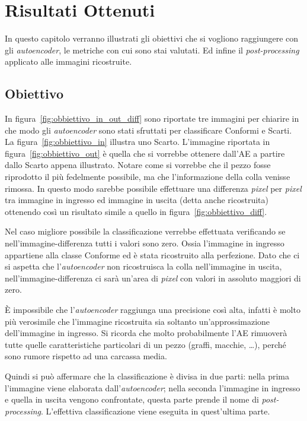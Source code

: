 
\chapter{Risultati Ottenuti}
In questo capitolo verranno illustrati gli obiettivi che si vogliono raggiungere con gli \textit{autoencoder}, le metriche con cui sono stai valutati.
Ed infine il \textit{post-processing} applicato alle immagini ricostruite.

\section{Obiettivo}
In figura~\ref{fig:obbiettivo_in_out_diff} sono riportate tre immagini per chiarire in che modo gli \textit{autoencoder} sono stati sfruttati per classificare Conformi e Scarti.
La figura~\ref{fig:obbiettivo_in} illustra uno Scarto.
L'immagine riportata in figura~\ref{fig:obbiettivo_out} è quella che si vorrebbe ottenere dall'AE a partire dallo Scarto appena illustrato.
Notare come si vorrebbe che il pezzo fosse riprodotto il più fedelmente possibile, ma che l'informazione della colla venisse rimossa.
In questo modo sarebbe possibile effettuare una differenza \textit{pixel} per \textit{pixel} tra immagine in ingresso ed immagine in uscita (detta anche ricostruita) ottenendo così un risultato simile a quello in figura~\ref{fig:obbiettivo_diff}.

Nel caso migliore possibile la classificazione verrebbe effettuata verificando se nell'immagine-differenza tutti i valori sono zero.
Ossia l'immagine in ingresso appartiene alla classe Conforme ed è stata ricostruito alla perfezione.
Dato che ci si aspetta che l'\textit{autoencoder} non ricostruisca la colla nell'immagine in uscita, nell'immagine-differenza ci sarà un'area di \textit{pixel} con valori in assoluto maggiori di zero.

È impossibile che l'\textit{autoencoder} raggiunga una precisione così alta, infatti è molto più verosimile che l'immagine ricostruita sia soltanto un'approssimazione dell'immagine in ingresso.
Si ricorda che molto probabilmente l'AE rimuoverà tutte quelle caratteristiche particolari di un pezzo (graffi, macchie, \dots ), perché sono rumore rispetto ad una carcassa media.

Quindi si può affermare che la classificazione è divisa in due parti: nella prima l'immagine viene elaborata dall'\textit{autoencoder}; nella seconda l'immagine in ingresso e quella in uscita vengono confrontate, questa parte prende il nome di \textit{post-processing}.
L'effettiva classificazione viene eseguita in quest'ultima parte.

